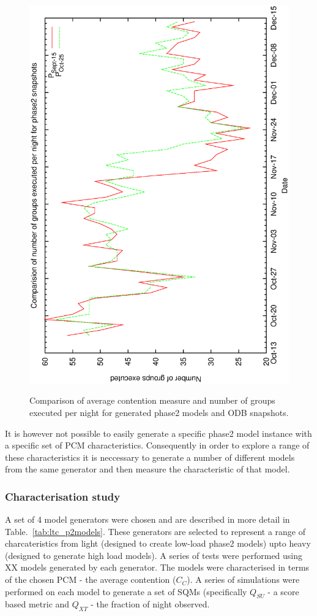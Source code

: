 \begin{figure}[h]
\begin{center}
{   \includegraphics[scale=0.5, angle=-90]{figures/c60_odb_ng.eps}
  }
\caption{Comparison of average contention measure and number of groups executed per night for generated phase2 models and ODB snapshots.}
 \end{center}
\end{figure}



It is however not possible to easily generate a specific phase2 model instance with a specific set of PCM characteristics. Consequently in order to explore a range of these characteristics it is neccessary to generate a number of different models from the same generator and then measure the characteristic of that model.

\subsubsection{Characterisation study}
A set of 4 model generators were chosen and are described in more detail in Table.~\ref{tab:ltc_p2models}. These generators are selected to represent a range of charcateristics from light (designed to create low-load phase2 models) upto heavy (designed to generate high load models). A series of tests were performed using XX models generated by each generator. The models were characterised in terms of the chosen PCM - the average contention ($C_C$). A series of simulations were performed on each model to generate a set of SQMs (specifically $Q_{SU}$ - a score based metric and $Q_{XT}$ - the fraction of night observed. 

